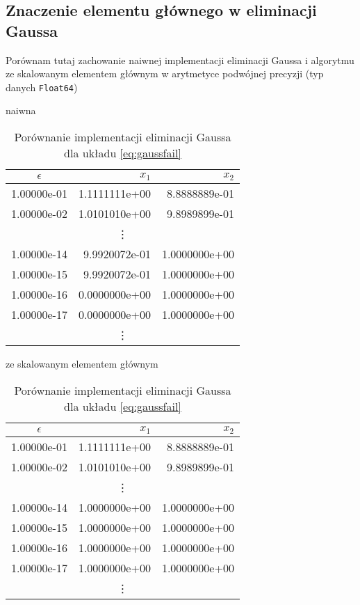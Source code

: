 \documentclass[11pt,wide]{mwart}
\begin{document}
\subsection{Znaczenie elementu głównego w eliminacji Gaussa}
Porównam tutaj zachowanie naiwnej implementacji eliminacji Gaussa i algorytmu ze skalowanym elementem głównym w arytmetyce podwójnej precyzji (typ danych \texttt{Float64})
\begin{center}
\begin{table}[!htb]
    \begin{subtable}{.5\linewidth}
      \centering
        \caption{naiwna}
\begin{tabular}{| c | r | r |} \hline
$ \epsilon $ & $x_1$ & $x_2$ \\ \hline
1.00000e-01 & 1.1111111e+00 & 8.8888889e-01 \\ \hline
1.00000e-02 & 1.0101010e+00 & 9.8989899e-01 \\
\multicolumn{3}{|c|}{\vdots} \\
1.00000e-14 & 9.9920072e-01 & 1.0000000e+00 \\ \hline
1.00000e-15 & 9.9920072e-01 & 1.0000000e+00 \\ \hline
1.00000e-16 & 0.0000000e+00 & 1.0000000e+00 \\ \hline
1.00000e-17 & 0.0000000e+00 & 1.0000000e+00 \\
\multicolumn{3}{|c|}{\vdots} \\ \hline
\end{tabular}
\end{subtable}%
\begin{subtable}{.5\linewidth}
\centering
\caption{ze skalowanym elementem głównym}
\begin{tabular}{| c | r | r |} \hline
$ \epsilon $ & $x_1$ & $x_2$ \\ \hline
1.00000e-01 & 1.1111111e+00 & 8.8888889e-01 \\ \hline
1.00000e-02 & 1.0101010e+00 & 9.8989899e-01 \\ \hline
\multicolumn{3}{|c|}{\vdots} \\
1.00000e-14 & 1.0000000e+00 & 1.0000000e+00 \\ \hline
1.00000e-15 & 1.0000000e+00 & 1.0000000e+00 \\ \hline
1.00000e-16 & 1.0000000e+00 & 1.0000000e+00 \\ \hline
1.00000e-17 & 1.0000000e+00 & 1.0000000e+00 \\
\multicolumn{3}{|c|}{\vdots} \\ \hline
\end{tabular}
\end{subtable}
\caption{Porównanie implementacji eliminacji Gaussa dla układu \eqref{eq:gaussfail}}
\end{table}
\end{center}
\end{document}

